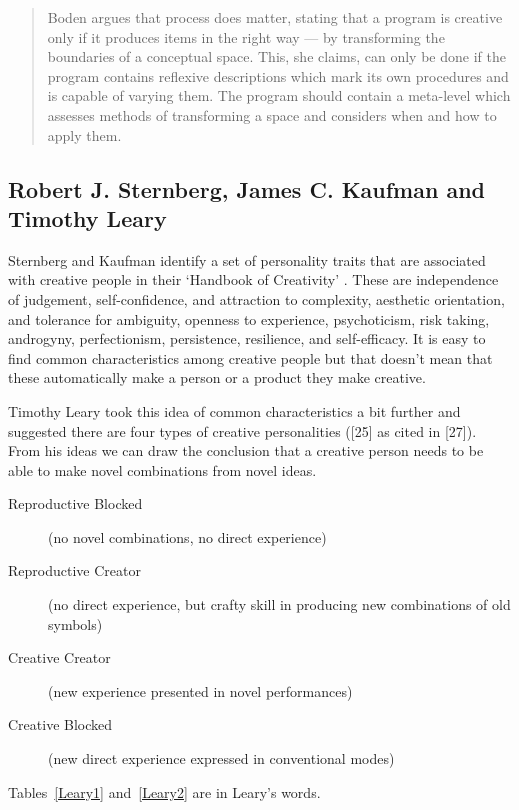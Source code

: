 \begin{quotation}
  Boden argues that process does matter, stating that a program is creative only if it produces items in the right way --- by transforming the boundaries of a conceptual space. This, she claims, can only be done if the program contains reflexive descriptions which mark its own procedures and is capable of varying them. The program should contain a meta-level which assesses methods of transforming a space and considers when and how to apply them. 
\end{quotation}


\subsection*{Robert J. Sternberg, James C. Kaufman and Timothy Leary}

Sternberg and Kaufman identify a set of personality traits that are associated with creative people in their `Handbook of Creativity' \autocite{Sternberg1999, Sternberg1999}. These are independence of judgement, self-confidence, and attraction to complexity, aesthetic orientation, and tolerance for ambiguity, openness to experience, psychoticism, risk taking, androgyny, perfectionism, persistence, resilience, and self-efficacy. It is easy to find common characteristics among creative people but that doesn't mean that these automatically make a person or a product they make creative.

Timothy Leary took this idea of common characteristics a bit further and suggested there are four types of creative personalities ([25] as cited in [27]). From his ideas we can draw the conclusion that a creative person needs to be able to make novel combinations from novel ideas.

\begin{description}
  \item [Reproductive Blocked] (no novel combinations, no direct experience)
  \item [Reproductive Creator] (no direct experience, but crafty skill in producing new combinations of old symbols)
  \item [Creative Creator] (new experience presented in novel performances)
  \item [Creative Blocked] (new direct experience expressed in conventional modes)
\end{description}

Tables~\ref{Leary1} and~\ref{Leary2} are in Leary's words.

